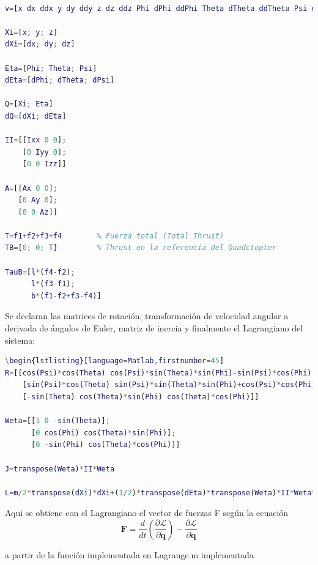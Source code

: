 \documentclass[twoside,11pt]{report}
\begin{document}
\begin{lstlisting}[language=Matlab,firstnumber=18]
% El vector de variables que se usaran

v=[x dx ddx y dy ddy z dz ddz Phi dPhi ddPhi Theta dTheta ddTheta Psi dPsi ddPsi]

Xi=[x; y; z]
dXi=[dx; dy; dz]

Eta=[Phi; Theta; Psi]
dEta=[dPhi; dTheta; dPsi]

Q=[Xi; Eta]
dQ=[dXi; dEta]

II=[[Ixx 0 0];
    [0 Iyy 0];
    [0 0 Izz]]

A=[[Ax 0 0];
   [0 Ay 0];
   [0 0 Az]]   
   
T=f1+f2+f3+f4        % Fuerza total (Total Thrust)
TB=[0; 0; T]         % Thrust en la referencia del Quadctopter

TauB=[l*(f4-f2);
      l*(f3-f1);
      b*(f1-f2+f3-f4)]   
\end{lstlisting}
\onehalfspacing
Se declaran las matrices de rotación, transformación de velocidad angular a derivada de ángulos de Euler, matriz de inercia y finalmente el Lagrangiano del sistema:
\singlespacing
\begin{lstlisting}[language=Matlab,firstnumber=45]
\begin{lstlisting}[language=Matlab,firstnumber=45]   
R=[[cos(Psi)*cos(Theta) cos(Psi)*sin(Theta)*sin(Phi)-sin(Psi)*cos(Phi) cos(Psi)*sin(Theta)*cos(Phi)+sin(Psi)*sin(Phi)];
    [sin(Psi)*cos(Theta) sin(Psi)*sin(Theta)*sin(Phi)+cos(Psi)*cos(Phi) sin(Psi)*sin(Theta)*cos(Phi)-cos(Psi)*sin(Phi)];
    [-sin(Theta) cos(Theta)*sin(Phi) cos(Theta)*cos(Phi)]]

Weta=[[1 0 -sin(Theta)];
      [0 cos(Phi) cos(Theta)*sin(Phi)];
      [0 -sin(Phi) cos(Theta)*cos(Phi)]]
  
J=transpose(Weta)*II*Weta  
  
L=m/2*transpose(dXi)*dXi+(1/2)*transpose(dEta)*transpose(Weta)*II*Weta*dEta-m*g*z
\end{lstlisting}
\onehalfspacing
Aqui se obtiene con el Lagrangiano el vector de fuerzas F según la ecuación 
\begin{equation}
\mathbf{F}=\frac{d}{dt}\left( \frac{\partial \mathcal{L}}{\partial \dot{\pmb{q}}} \right) - \frac{\partial \mathcal{L}}{\partial \pmb{q}}
\end{equation}

a partir de la función implementada en Lagrange.m implementada \cite{Lagrangian_Matlab} \\
\end{document}
